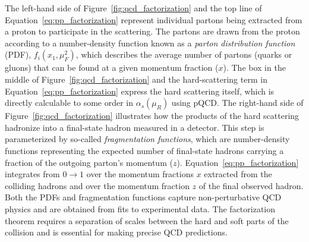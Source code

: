The left-hand side of Figure~\ref{fig:qcd_factorization} and the top line of Equation~\ref{eq:pp_factorization} represent individual partons being extracted from a proton to participate in the scattering.
The partons are drawn from the proton according to a number-density function known as a \textit{parton distribution function} (PDF), $f_i\left(x_1,\mu_F^2\right)$, which describes the average number of partons (quarks or gluons) that can be found at a given momentum fraction ($x$).
The box in the middle of Figure~\ref{fig:qcd_factorization} and the hard-scattering term in Equation~\ref{eq:pp_factorization} express the hard scattering itself, which is directly calculable to some order in $\alpha_s \left(\mu_R\right)$ using pQCD.
The right-hand side of Figure~\ref{fig:qcd_factorization} illustrates how the products of the hard scattering hadronize into a final-state hadron measured in a detector.
This step is parameterized by so-called \textit{fragmentation functions}, which are number-density functions representing the expected number of final-state hadrons carrying a fraction of the outgoing parton's momentum ($z$).
Equation~\ref{eq:pp_factorization} integrates from $0\rightarrow 1$ over the momentum fractions $x$ extracted from the colliding hadrons and over the momentum fraction $z$ of the final observed hadron.
Both the PDFs and fragmentation functions capture non-perturbative QCD physics and are obtained from fits to experimental data.
The factorization theorem requires a separation of scales between the hard and soft parts of the collision and is essential for making precise QCD predictions.
